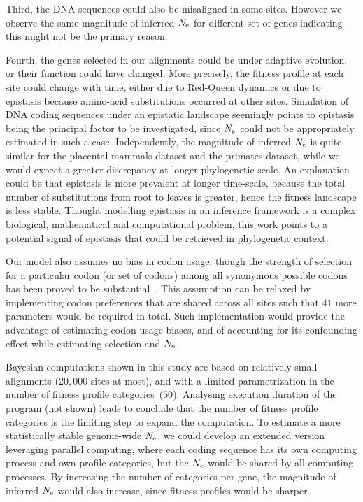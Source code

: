 Third, the \acrshort{DNA} sequences could also be misaligned in some sites.
However we observe the same magnitude of inferred $N_{\mathrm{e}}$ for different set of genes indicating this might not be the primary reason.

Fourth, the genes selected in our alignments could be under adaptive evolution, or their function could have changed.
More precisely, the fitness profile at each site could change with time, either due to Red-Queen dynamics or due to epistasis because amino-acid substitutions occurred at other sites.
Simulation of \acrshort{DNA} coding sequences under an epistatic landscape seemingly points to epistasis being the principal factor to be investigated, since $N_{\mathrm{e}}$ could not be appropriately estimated in such a case.
Independently, the magnitude of inferred $N_{\mathrm{e}}$ is quite similar for the placental mammals dataset and the primates dataset, while we would expect a greater discrepancy at longer phylogenetic scale.
An explanation could be that epistasis is more prevalent at longer time-scale, because the total number of substitutions from root to leaves is greater, hence the fitness landscape is less stable.
Thought modelling epistasis in an inference framework is a complex biological, mathematical and computational problem, this work points to a potential signal of epistasis that could be retrieved in phylogenetic context.

Our model also assumes no bias in codon usage, though the strength of selection for a particular codon (or set of codons) among all synonymous possible codons has been proved to be substantial~\citep{Yang2008,Plotkin2011}.
This assumption can be relaxed by implementing codon preferences that are shared across all sites such that $41$ more parameters would be required in total.
Such implementation would provide the advantage of estimating codon usage biases, and of accounting for its confounding effect while estimating selection and $N_{\mathrm{e}}$.

Bayesian computations shown in this study are based on relatively small alignments ($20,000$ sites at most), and with a limited parametrization in the number of fitness profile categories~($50$).
Analysing execution duration of the program (not shown) leads to conclude that the number of fitness profile categories is the limiting step to expand the computation.
To estimate a more statistically stable genome-wide $N_{\mathrm{e}}$, we could develop an extended version leveraging parallel computing, where each coding sequence has its own computing process and own profile categories, but the $N_{\mathrm{e}}$ would be shared by all computing processes.
By increasing the number of categories per gene, the magnitude of inferred $N_{\mathrm{e}}$ would also increase, since fitness profiles would be sharper.

